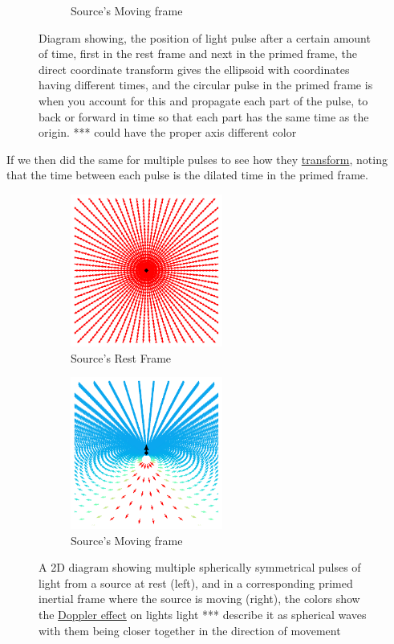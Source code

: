 \begin{figure}[H]
\begin{subfigure}{.32\textwidth}
		\caption{Source's Moving frame}
	\end{subfigure}
	\caption{Diagram showing, the position of light pulse after a certain amount of time, first in the rest frame and next in the primed frame, the direct coordinate transform gives the ellipsoid with coordinates having different times, and the circular pulse in the primed frame is when you account for this and propagate each part of the pulse, to back or forward in time so that each part has the same time as the origin. *** could have the proper axis different color}
\end{figure}

If we then did the same for multiple pulses to see how they \hyperlink{def-transform}{transform}, noting that the time between each pulse is the dilated time in the primed frame.

\begin{figure}[H]
	\begin{subfigure}{.49\textwidth}
		\centering
		\includegraphics[width=5cm]{images/pdf/Field_Rest_Frame.pdf}
		\caption{Source's Rest Frame}
	\end{subfigure}
	\begin{subfigure}{.49\textwidth}
		\centering
		\includegraphics[width=5cm]{images/pdf/Field_Moving_Frame_Doppler.pdf}
		\caption{Source's Moving frame}
	\end{subfigure}
	\caption{A 2D diagram showing multiple spherically symmetrical pulses of light from a source at rest  (left), and in a corresponding primed inertial frame where the source is moving (right), the colors show the \protect\hyperlink{def-doppler-effect}{Doppler effect} on lights light *** describe it as spherical waves with them being closer together in the direction of movement}
	\label{fig: full field transformation}
\end{figure}

